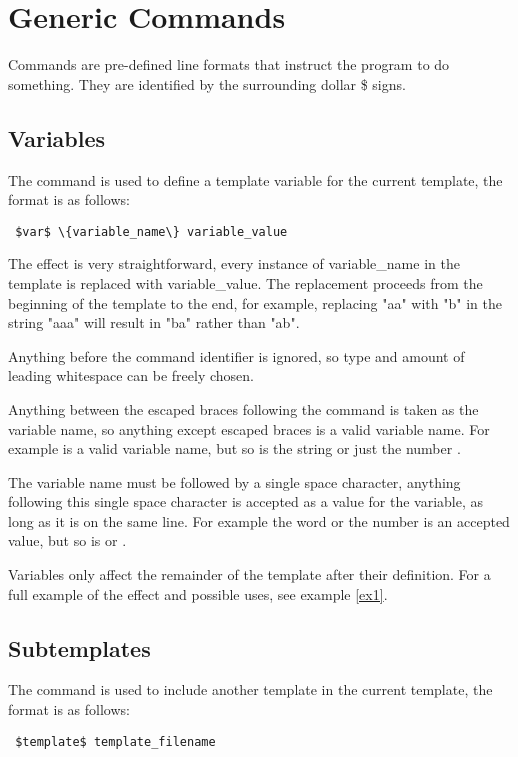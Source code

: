 \documentclass{settings/TU_Delft_Report}
\begin{document}
\newpage
\section{Generic Commands}
Commands are pre-defined line formats that instruct the program to do something. They are identified by the surrounding dollar \$ signs.

\subsection{Variables}
The  command is used to define a template variable for the current template, the format is as follows:
\begin{lstlisting}
 $var$ \{variable_name\} variable_value
\end{lstlisting}

\vsp The effect is very straightforward, every instance of variable\_name in the template is replaced with variable\_value. The replacement proceeds from the beginning of the template to the end, for example, replacing "aa" with "b" in the string "aaa" will result in "ba" rather than "ab".

\vsp Anything before the command identifier is ignored, so type and amount of leading whitespace can be freely chosen.

\vsp Anything between the escaped braces following the  command is taken as the variable name, so anything except escaped braces is a valid variable name. For example  is a valid variable name, but so is the string  or just the number  .

\vsp The variable name must be followed by a single space character, anything following this single space character is accepted as a value for the variable, as long as it is on the same line. For example the word  or the number  is an accepted value, but so is  or .

\vsp Variables only affect the remainder of the template after their definition. For a full example of the effect and possible uses, see example \ref{ex1}.

\subsection{Subtemplates}
The  command is used to include another template in the current template, the format is as follows:
\begin{lstlisting}
 $template$ template_filename
\end{lstlisting}
\end{document}
